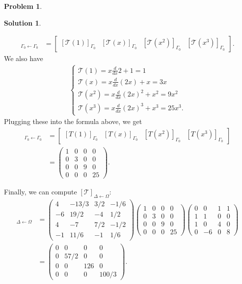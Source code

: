 \documentclass{article}
\theoremstyle{definition}
\newtheorem*{prob*}{Problem}
\newtheorem*{sln*}{Solution}
\newcommand{\T}{\mathcal{T}}
\begin{document}
\begin{prob*}
\begin{sln*}
\begin{enumerate}
\begin{enumerate}
				\begin{align*}
				[\T]_{\Gamma_0\leftarrow\Gamma_0} &= \begin{bmatrix}
				[\T(1)]_{\Gamma_0} & [\T(x)]_{\Gamma_0} & [\T(x^2)]_{\Gamma_0} & [\T(x^3)]_{\Gamma_0}
				\end{bmatrix}.
				\end{align*}
				We also have
				\begin{align*}
				\begin{cases}
				\T(1) = x\frac{d}{dx}2 + 1 = 1\\
				\T(x) = x\frac{d}{dx}(2x) + x = 3x\\
				\T(x^2) = x\frac{d}{dx}(2x)^2 + x^2 = 9x^2\\
				\T(x^3) = x\frac{d}{dx}(2x)^3 + x^3 = 25x^3.
				\end{cases}
				\end{align*}
				Plugging these into the formula above, we get
				\begin{align*}
				[\T]_{\Gamma_0\leftarrow\Gamma_0} &= \begin{bmatrix}
				[T(1)]_{\Gamma_0} & [T(x)]_{\Gamma_0} & [T(x^2)]_{\Gamma_0} & [T(x^3)]_{\Gamma_0}
				\end{bmatrix}\\
				&= \begin{pmatrix}
				1&0&0&0\\
				0&3&0&0\\
				0&0&9&0\\
				0&0&0&25
				\end{pmatrix}.
				\end{align*}
				
				Finally, we can compute $[\T]_{\Delta\leftarrow\Omega}$:
				\begin{align*}
				[\T]_{\Delta\leftarrow\Omega} &=     
				\begin{pmatrix}
				4&-13/3&3/2&-1/6\\
				-6&19/2&-4&1/2\\
				4&-7&7/2&-1/2\\
				-1&11/6&-1&1/6
				\end{pmatrix}
				\begin{pmatrix}
				1&0&0&0\\
				0&3&0&0\\
				0&0&9&0\\
				0&0&0&25
				\end{pmatrix}
				\begin{pmatrix}
				0&0&1&1\\
				1&1&0&0\\
				1&0&4&0\\
				0&-6&0&8
				\end{pmatrix}\\
				&= \begin{pmatrix}
				0&0&0&0\\
				0&57/2&0&0\\
				0&0&126&0\\
				0&0&0&100/3
				\end{pmatrix}.
				\end{align*}
				

\end{enumerate}
\end{enumerate}
\end{sln*}
\end{prob*}
\end{document}
